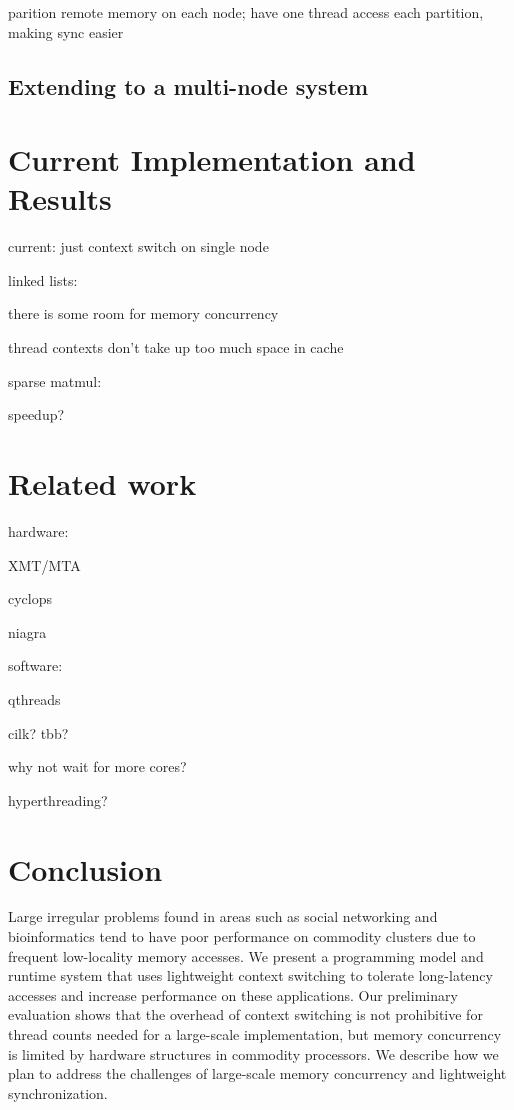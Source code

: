 \documentclass{acm_proc_article-sp}
\begin{document}
parition remote memory on each node; have one thread access each
partition, making sync easier

\subsection{Extending to a multi-node system}


\section{Current Implementation and Results}



current: just context switch on single node


linked lists:

there is some room for memory concurrency

thread contexts don't take up too much space in cache

sparse matmul:

speedup?






\section{Related work}


hardware:

XMT/MTA

cyclops

niagra

software:

qthreads

cilk? tbb?

why not wait for more cores?

hyperthreading?



\section{Conclusion}

Large irregular problems found in areas such as social networking and
bioinformatics tend to have poor performance on commodity clusters due
to frequent low-locality memory accesses. We present a programming
model and runtime system that uses lightweight context switching to
tolerate long-latency accesses and increase performance on these
applications. Our preliminary evaluation shows that the overhead of
context switching is not prohibitive for thread counts needed for a
large-scale implementation, but memory concurrency is limited by
hardware structures in commodity processors. We describe how we plan
to address the challenges of large-scale memory concurrency and
lightweight synchronization.




\end{document}
